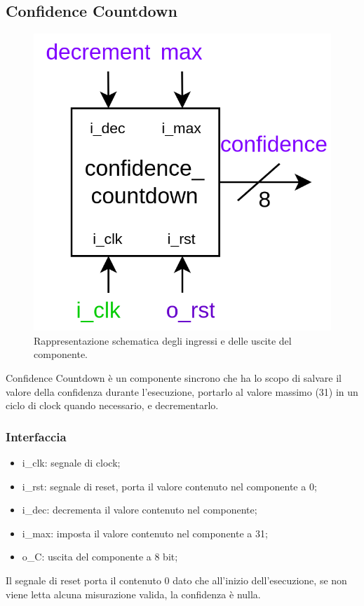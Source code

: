 \documentclass[12pt,a4paper]{scrartcl}
\begin{document}
    \subsection{Confidence Countdown}
    \begin{figure}[htbp]
      \centering
      \includegraphics[width=0.6\linewidth]{schema-confidence_countdown.png}
      \caption{Rappresentazione schematica degli ingressi e delle uscite del componente.}
      \label{fig:componente}
    \end{figure}
    Confidence Countdown è un componente sincrono che ha lo scopo di salvare il valore della confidenza durante l'esecuzione, portarlo al valore massimo (31) in un ciclo di clock quando necessario, e decrementarlo.
    \subsubsection{Interfaccia}
    \begin{itemize}
        \item i\_clk: segnale di clock;
        \item i\_rst: segnale di reset, porta il valore contenuto nel componente a 0; 
        \item i\_dec: decrementa il valore contenuto nel componente;
        \item i\_max: imposta il valore contenuto nel componente a 31;
        \item o\_C: uscita del componente a 8 bit;
    \end{itemize}
    Il segnale di reset porta il contenuto 0 dato che all'inizio dell'esecuzione, se non viene letta alcuna misurazione valida, la confidenza è nulla. 
    \newpage
\end{document}
